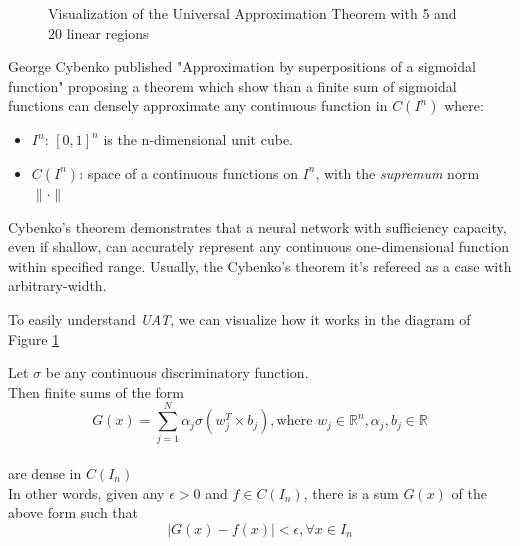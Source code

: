 \documentclass{tufte-handout}
\begin{document}
\begin{figure}[h]
\caption{Visualization of the Universal Approximation Theorem with 5 and 20 linear regions}
\label{fig:UAT}
\end{figure}

George Cybenko published "Approximation by superpositions of a sigmoidal function" proposing a theorem which show than a finite sum of sigmoidal functions can densely approximate any continuous function in $C(I^n)$ where:
\begin{itemize}
    \item $I^n$: $[0,1]^n$ is the n-dimensional unit cube.
    \item $C(I^n)$: space of a continuous functions on $I^n$, with the \textit{supremum} norm $\| \cdot \|$
\end{itemize}

Cybenko's theorem demonstrates that a neural network with sufficiency capacity, even if shallow, can accurately represent any continuous one-dimensional function within specified range. Usually, the Cybenko's theorem it's refereed as a case with arbitrary-width.

To easily understand \textit{UAT}, we can visualize how it works in the diagram of Figure \ref{fig:UAT}

\begin{algorithm}[h]
    \caption{Cybenko's Theorem}
        Let $\sigma$ be any continuous discriminatory function. \\
        Then finite sums of the form \\
        \begin{equation*}
            G(x) = \sum_{j=1}^N \alpha_j \sigma(w_j^T \times b_j), \text{where } w_j \in \mathbb{R}^n, \alpha_j, b_j \in \mathbb{R}
        \end{equation*} \\
        are dense in $C(I_n)$ \\
        In other words, given any $\epsilon  > 0$ and $f \in C(I_n)$, there is a sum $G(x)$ of the above form such that \\
        \begin{equation*}
            |G(x) - f(x)| < \epsilon, \forall x \in I_n
        \end{equation*}

\end{algorithm}
\end{document}
